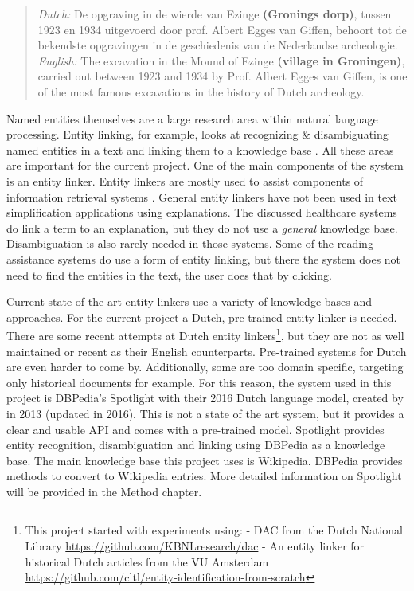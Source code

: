 \documentclass[
10pt, %
a4paper, %
oneside, %
headinclude,footinclude, %
] {book}%
\begin{document}
\begin{quote}
  \textit{Dutch:} De opgraving in de wierde van Ezinge \textbf{(Gronings dorp)}, tussen 1923 en 1934 uitgevoerd door prof. Albert Egges van Giffen, behoort tot de bekendste opgravingen in de geschiedenis van de Nederlandse archeologie.\newline
  \textit{English:} The excavation in the Mound of Ezinge \textbf{(village in Groningen)}, carried out between 1923 and 1934 by Prof. Albert Egges van Giffen, is one of the most famous excavations in the history of Dutch archeology.
\end{quote}

Named entities themselves are a large research area within natural language processing.
Entity linking, for example, looks at recognizing \& disambiguating named entities in a text and linking them to a knowledge base \citep{shen2015,vanhulst2020}.
All these areas are important for the current project.
One of the main components of the system is an entity linker.
Entity linkers are mostly used to assist components of information retrieval systems \citep{delpeuch2019,vanhulst2020}.
General entity linkers have not been used in text simplification applications using explanations.
The discussed healthcare systems do link a term to an explanation, but they do not use a \textit{general} knowledge base.
Disambiguation is also rarely needed in those systems.
Some of the reading assistance systems do use a form of entity linking, but there the system does not need to find the entities in the text, the user does that by clicking.

Current state of the art entity linkers use a variety of knowledge bases and approaches.
For the current project a Dutch, pre-trained entity linker is needed.
There are some recent attempts at Dutch entity linkers\footnote{This project started with experiments using:\newline
  - DAC from the Dutch National Library \url{https://github.com/KBNLresearch/dac} \newline
  - An entity linker for historical Dutch articles from the VU Amsterdam \url{https://github.com/cltl/entity-identification-from-scratch}}, but they are not as well maintained or recent as their English counterparts.
Pre-trained systems for Dutch are even harder to come by.
Additionally, some are too domain specific, targeting only historical documents for example.
For this reason, the system used in this project is DBPedia's Spotlight with their 2016 Dutch language model, created by \citeauthor{daiber2013} in 2013 (updated in 2016).
This is not a state of the art system, but it provides a clear and usable API and comes with a pre-trained model.
Spotlight provides entity recognition, disambiguation and linking using DBPedia as a knowledge base.
The main knowledge base this project uses is Wikipedia.
DBPedia provides methods to convert to Wikipedia entries.
More detailed information on Spotlight will be provided in the Method chapter.
\end{document}
